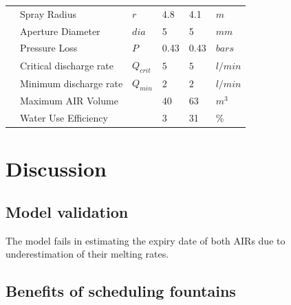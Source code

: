 \documentclass[tc, manuscript]{copernicus}
\begin{document}
\begin{table}
\begin{tabular}{@{}|llllll|@{}}
                           & Spray Radius                    &  $r$            & 4.8           & 4.1           & $m$ \\
		\multicolumn{1}{|l|}{} & Aperture Diameter               &  $dia$          & 5             & 5             & $mm$ \\
		\multicolumn{1}{|l|}{} & Pressure Loss                   &  $P$            & 0.43          & 0.43         & $bars$ \\
		\multicolumn{1}{|l|}{} & Critical discharge rate         &  $Q_{crit}$     & $5$           & $5$          & $l/min$ \\
		\multicolumn{1}{|l|}{} & Minimum discharge rate          &  $Q_{min}$      & $2$           & $2$          & $l/min$ \\\midrule
		\multicolumn{1}{|l|}{\multirow{2}{*}{\rotatebox[origin=c]{90}{AIR}}}

		                       & Maximum AIR Volume              &                 & 40            & 63            & $m^{3}$ \\
		\multicolumn{1}{|l|}{} & Water Use Efficiency            &                 & 3             & 31            & \% \\\midrule
	\end{tabular}
\end{table}


\section{Discussion}

\subsection{Model validation}

The model fails in estimating the expiry date of both AIRs due to underestimation of their melting rates.


\subsection{Benefits of scheduling fountains}
\end{document}
